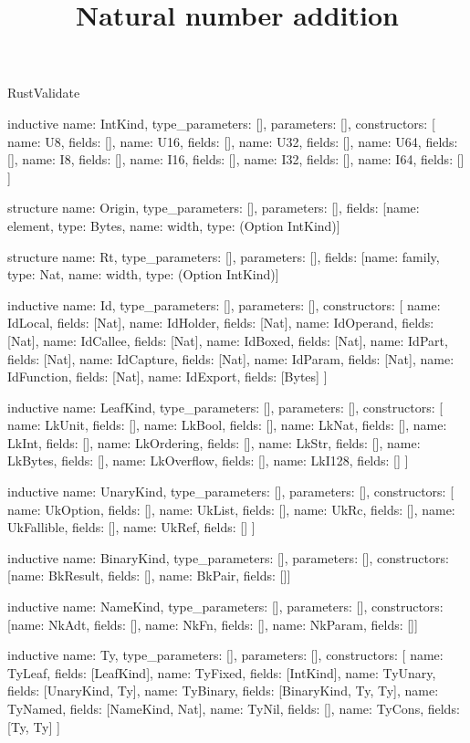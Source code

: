 \begin{lexlean}{RustValidate}
\title{Natural number addition}
\begin{semanticmodule}
inductive{
  name: IntKind,
  type_parameters: [],
  parameters: [],
  constructors: [
    {name: U8, fields: []},
    {name: U16, fields: []},
    {name: U32, fields: []},
    {name: U64, fields: []},
    {name: I8, fields: []},
    {name: I16, fields: []},
    {name: I32, fields: []},
    {name: I64, fields: []}
  ]
}

structure{
  name: Origin,
  type_parameters: [],
  parameters: [],
  fields: [{name: element, type: Bytes}, {name: width, type: (Option IntKind)}]
}

structure{
  name: Rt,
  type_parameters: [],
  parameters: [],
  fields: [{name: family, type: Nat}, {name: width, type: (Option IntKind)}]
}

inductive{
  name: Id,
  type_parameters: [],
  parameters: [],
  constructors: [
    {name: IdLocal, fields: [Nat]},
    {name: IdHolder, fields: [Nat]},
    {name: IdOperand, fields: [Nat]},
    {name: IdCallee, fields: [Nat]},
    {name: IdBoxed, fields: [Nat]},
    {name: IdPart, fields: [Nat]},
    {name: IdCapture, fields: [Nat]},
    {name: IdParam, fields: [Nat]},
    {name: IdFunction, fields: [Nat]},
    {name: IdExport, fields: [Bytes]}
  ]
}

inductive{
  name: LeafKind,
  type_parameters: [],
  parameters: [],
  constructors: [
    {name: LkUnit, fields: []},
    {name: LkBool, fields: []},
    {name: LkNat, fields: []},
    {name: LkInt, fields: []},
    {name: LkOrdering, fields: []},
    {name: LkStr, fields: []},
    {name: LkBytes, fields: []},
    {name: LkOverflow, fields: []},
    {name: LkI128, fields: []}
  ]
}

inductive{
  name: UnaryKind,
  type_parameters: [],
  parameters: [],
  constructors: [
    {name: UkOption, fields: []},
    {name: UkList, fields: []},
    {name: UkRc, fields: []},
    {name: UkFallible, fields: []},
    {name: UkRef, fields: []}
  ]
}

inductive{
  name: BinaryKind,
  type_parameters: [],
  parameters: [],
  constructors: [{name: BkResult, fields: []}, {name: BkPair, fields: []}]
}

inductive{
  name: NameKind,
  type_parameters: [],
  parameters: [],
  constructors: [{name: NkAdt, fields: []}, {name: NkFn, fields: []}, {name: NkParam, fields: []}]
}

inductive{
  name: Ty,
  type_parameters: [],
  parameters: [],
  constructors: [
    {name: TyLeaf, fields: [LeafKind]},
    {name: TyFixed, fields: [IntKind]},
    {name: TyUnary, fields: [UnaryKind, Ty]},
    {name: TyBinary, fields: [BinaryKind, Ty, Ty]},
    {name: TyNamed, fields: [NameKind, Nat]},
    {name: TyNil, fields: []},
    {name: TyCons, fields: [Ty, Ty]}
  ]
}


\end{semanticmodule}
\end{lexlean}
